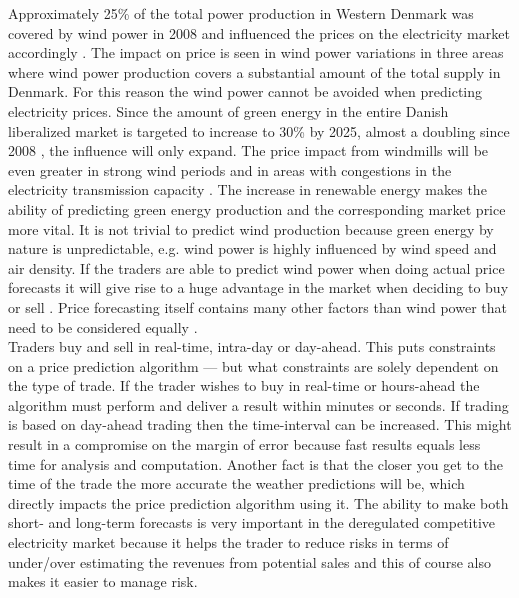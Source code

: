 Approximately 25\% of the total power production in Western Denmark was covered by wind power in 2008 and influenced the prices on the electricity market accordingly \cite{windPowerDanishLiberalized}. The impact on price is seen in wind power variations in three areas where wind power production covers a substantial amount of the total supply in Denmark. For this reason the wind power cannot be avoided when predicting electricity prices\cite{dayAheadImpactOfWindPowerForecasts}. Since the amount of green energy in the entire Danish liberalized market is targeted to increase to 30\% by 2025, almost a doubling since 2008 \cite{windPowerDanishLiberalized}, the influence will only expand. The price impact from windmills will be even greater in strong wind periods and in areas with congestions in the electricity transmission capacity \cite{windPowerDanishLiberalized}. The increase in renewable energy makes the ability of predicting green energy production and the corresponding market price more vital. It is not trivial to predict wind production because green energy by nature is unpredictable, e.g. wind power is highly influenced by wind speed and air density. If the traders are able to predict wind power when doing actual price forecasts it will give rise to a huge advantage in the market when deciding to buy or sell \cite{dayAheadImpactOfWindPowerForecasts}. Price forecasting itself contains many other factors than wind power that need to be considered equally \cite{21}.
\\[0.5cm] Traders buy and sell in real-time, intra-day or day-ahead. This puts constraints on a price prediction algorithm --- but what constraints are solely dependent on the type of trade. If the trader wishes to buy in real-time or hours-ahead the algorithm must perform and deliver a result within minutes or seconds. If trading is based on day-ahead trading then the time-interval can be increased. This might result in a compromise on the margin of error because fast results equals less time for analysis and computation. Another fact is that the closer you get to the time of the trade the more accurate the weather predictions will be, which directly impacts the price prediction algorithm using it. The ability to make both short- and long-term forecasts is very important in the deregulated competitive electricity market because it helps the trader to reduce risks in terms of under/over estimating the revenues from potential sales and this of course also makes it easier to manage risk\cite{21}.
\\[0.5cm]
